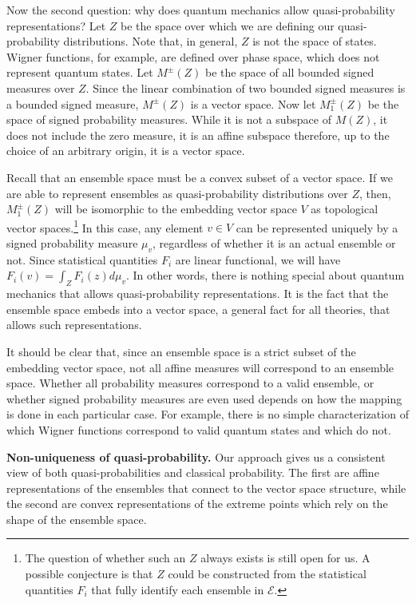 \documentclass[10pt,twocolumn, nofootinbib]{revtex4-2}
\newcommand{\Ens}[1][E] {\mathcal{#1}} %
\begin{document}
Now the second question: why does quantum mechanics allow quasi-probability representations? Let $Z$ be the space over which we are defining our quasi-probability distributions. Note that, in general, $Z$ is not the space of states. Wigner functions, for example, are defined over phase space, which does not represent quantum states. Let $M^{\pm}(Z)$ be the space of all bounded signed measures over $Z$. Since the linear combination of two bounded signed measures is a bounded signed measure, $M^{\pm}(Z)$ is a vector space. Now let $M_1^{\pm}(Z)$ be the space of signed probability measures. While it is not a subspace of $M(Z)$, it does not include the zero measure, it is an affine subspace therefore, up to the choice of an arbitrary origin, it is a vector space.

Recall that an ensemble space must be a convex subset of a vector space. If we are able to represent ensembles as quasi-probability distributions over $Z$, then, $M_1^{\pm}(Z)$ will be isomorphic to the embedding vector space $V$ as topological vector spaces.\footnote{The question of whether such an $Z$ always exists is still open for us. A possible conjecture is that $Z$ could be constructed from the statistical quantities $F_i$ that fully identify each ensemble in $\Ens$.} In this case, any element $v\in V$ can be represented uniquely by a signed probability measure $\mu_{v}$, regardless of whether it is an actual ensemble or not. Since statistical quantities $F_i$ are linear functional, we will have $F_i(v) = \int_Z F_i(z) d\mu_{v}$. In other words, there is nothing special about quantum mechanics that allows quasi-probability representations. It is the fact that the ensemble space embeds into a vector space, a general fact for all theories, that allows such representations.

It should be clear that, since an ensemble space is a strict subset of the embedding vector space, not all affine measures will correspond to an ensemble space. Whether all probability measures correspond to a valid ensemble, or whether signed probability measures are even used depends on how the mapping is done in each particular case. For example, there is no simple characterization of which Wigner functions correspond to valid quantum states and which do not.


\textbf{Non-uniqueness of quasi-probability.} Our approach gives us a consistent view of both quasi-probabilities and classical probability. The first are affine representations of the ensembles that connect to the vector space structure, while the second are convex representations of the extreme points which rely on the shape of the ensemble space.
\end{document}
